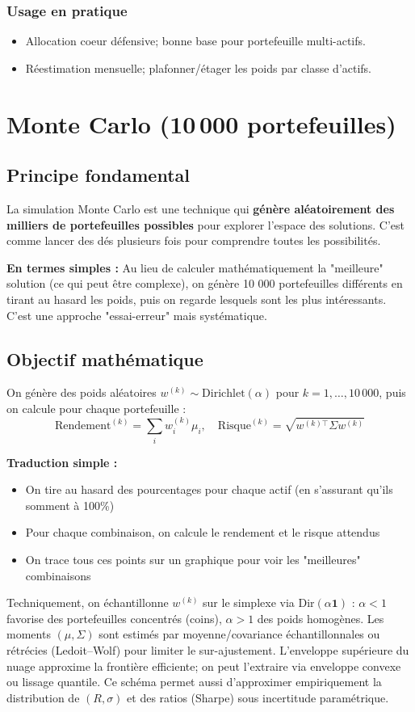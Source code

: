 \documentclass[11pt,a4paper]{article}
\begin{document}
\subsubsection*{Usage en pratique}
\begin{itemize}
  \item Allocation coeur défensive; bonne base pour portefeuille multi-actifs.
  \item Réestimation mensuelle; plafonner/étager les poids par classe d'actifs.
\end{itemize}

\FloatBarrier
\section{Monte Carlo (10\,000 portefeuilles)}

\subsection{Principe fondamental}
La simulation Monte Carlo est une technique qui \textbf{génère aléatoirement des milliers de portefeuilles possibles} pour explorer l'espace des solutions. C'est comme lancer des dés plusieurs fois pour comprendre toutes les possibilités.

\textbf{En termes simples :} Au lieu de calculer mathématiquement la "meilleure" solution (ce qui peut être complexe), on génère 10 000 portefeuilles différents en tirant au hasard les poids, puis on regarde lesquels sont les plus intéressants. C'est une approche "essai-erreur" mais systématique.

\subsection{Objectif mathématique}
On génère des poids aléatoires \(w^{(k)} \sim \text{Dirichlet}(\alpha)\) pour \(k = 1, \ldots, 10\,000\), puis on calcule pour chaque portefeuille :
\[\text{Rendement}^{(k)} = \sum_i w_i^{(k)} \mu_i, \quad \text{Risque}^{(k)} = \sqrt{w^{(k)\top} \Sigma w^{(k)}}\]

\textbf{Traduction simple :} 
\begin{itemize}
\item On tire au hasard des pourcentages pour chaque actif (en s'assurant qu'ils somment à 100\%)
\item Pour chaque combinaison, on calcule le rendement et le risque attendus
\item On trace tous ces points sur un graphique pour voir les "meilleures" combinaisons
\end{itemize}
\noindent Techniquement, on échantillonne \(w^{(k)}\) sur le simplexe via \(\text{Dir}(\alpha\mathbf{1})\) : \(\alpha<1\) favorise des portefeuilles concentrés (coins), \(\alpha>1\) des poids homogènes. Les moments \((\mu,\Sigma)\) sont estimés par moyenne/covariance échantillonnales ou rétrécies (Ledoit–Wolf) pour limiter le sur-ajustement. L'enveloppe supérieure du nuage approxime la frontière efficiente; on peut l'extraire via enveloppe convexe ou lissage quantile. Ce schéma permet aussi d'approximer empiriquement la distribution de \((R,\sigma)\) et des ratios (Sharpe) sous incertitude paramétrique.
\end{document}
